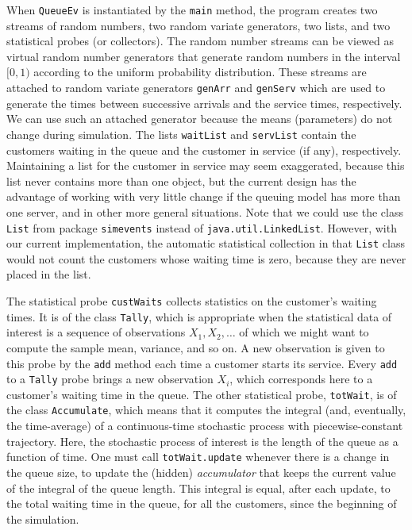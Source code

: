 When \texttt{QueueEv} is instantiated  by the \texttt{main} method, 
the program creates
two streams of random numbers,
two random variate generators, two
lists, and two statistical probes (or collectors).
The random number streams can be
viewed as virtual random number generators that generate random
numbers in the interval $[0,1)$ according to the uniform probability
distribution.  These streams are attached to random variate generators
\texttt{genArr} and \texttt{genServ} which are used to generate the times
between successive arrivals and the service times, respectively.
We can use such an attached generator because the means (parameters)
do not change during simulation.
The lists \texttt{waitList} and \texttt{servList} contain the customers
waiting in the queue and the customer in service (if any), respectively.
Maintaining a list for the customer in service may seem exaggerated,
because this list never contains more than one object, but the current
design has the advantage of working with very little change if the
queuing model has more than one server, and in other more general 
situations.
Note that we could use the class \texttt{List} from package 
\texttt{simevents} instead of \texttt{java.util.LinkedList}.
However, with our current implementation,
the automatic statistical collection in that \texttt{List} 
class would not count the customers whose waiting time is zero, because
they are never placed in the list.
\begin{comment}
Here we use the class \texttt{List} from package \texttt{simevents}.
This class is equivalent to the standard class \texttt{java.util.LinkedList}, 
except that its implementation is more efficient than the current one
in JDK and it can also collect statistics automatically.
However, the automatic statistical collection on \texttt{waitList} 
would not count the customers whose waiting time is zero, because
they are never placed in this list, so we do not use this facility.
\end{comment}

The statistical probe \texttt{custWaits} collects statistics on the
customer's waiting times.  It is of the class \texttt{Tally}, which 
is appropriate when the statistical data of interest is  a sequence 
of observations $X_1, X_2, \dots$ of which we might want to compute 
the sample mean, variance, and so on.
A new observation is given to this probe by the \texttt{add} method
each time a customer starts its service.
Every \texttt{add} to a \texttt{Tally} probe brings a new observation $X_i$,
which corresponds here to a customer's waiting time in the queue.
The other statistical probe, \texttt{totWait}, is of the class
\texttt{Accumulate}, which means that it computes the integral
(and, eventually, the time-average) of a continuous-time
stochastic process with piecewise-constant trajectory.
Here, the stochastic process of interest is the length of the queue
as a function of time.  One must call \texttt{totWait.update} whenever 
there is a change in the queue size, to update the (hidden)
{\em accumulator\/} that keeps the current value of the integral
of the queue length.  This integral is equal, after each update,
to the total waiting time in the queue, for all the customers,
since the beginning of the simulation.  

